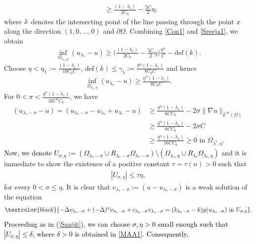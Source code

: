 \documentclass[11pt, notitlepage]{article}
\newcommand{\De} {\Delta}
\begin{document}
{\begin{align}
    &\geq \frac{(1-\lambda_1)}{2C_0}-\frac{5C}{2}\eta,
\end{align}
where $\Tilde{x}$ denotes the intersecting point of the line passing through the point $x$ along the direction $(1,0,...,0)$ and $\partial \Omega$. Combining \eqref{Con1} and \eqref{Sreeja1}, we obtain
\begin{align*}
    \inf_{\Omega_{\lambda_*,\eta}}(u_{\lambda_*}-u)\geq \Big( \frac{(1-\lambda_1)}{2C_0}-\frac{5C}{2}\eta\Big)\frac{\eta^\alpha}{C}-\mathrm{def}(k).
\end{align*}
Choose $\eta<\eta_1:=\frac{(1-\lambda_1)}{10C_0C}$, $\mathrm{def}(k)\leq \gamma_1:=\frac{\eta^\alpha(1-\lambda_1)}{8C_0C}$ and hence
\begin{align*}
     \inf_{\Omega_{\lambda_*,\eta}}(u_{\lambda_*}-u)\geq \frac{\eta^\alpha(1-\lambda_1)}{8C_0C}.
\end{align*}
For $0<\sigma< \frac{\eta^\alpha(1-\lambda_1)}{32C^2C_0}$, we have
\begin{align}\label{Sreeja2}
   (u_{\lambda_*-\sigma}-u)=(u_{\lambda_*-\sigma}-u_{\lambda_*}+u_{\lambda_*}-u)&\geq  \frac{\eta^\alpha(1-\lambda_1)}{8CC_0}-2\sigma\|\nabla u\|_{L^\infty(\Omega)}\nonumber\\
   &\geq  \frac{\eta^\alpha(1-\lambda_1)}{8CC_0}-2\sigma C\nonumber\\
   &\geq  \frac{\eta^\alpha(1-\lambda_1)}{16CC_0}\geq 0 \text{ in }\Omega_{\lambda^*,\eta}.
\end{align}
\textcolor{black}{Now, we denote $U_{\sigma,\eta}:=({\Omega}_{\lambda_*-\sigma}\cup R_{\lambda_*-\sigma}{\Omega}_{\lambda_*-\sigma})\setminus({\Omega}_{\lambda_*,\eta}\cup R_{\lambda_*}{\Omega}_{\lambda_*,\eta})$} and it is immediate to show the existence of a positive constant $\tau=\tau(n)>0$ such that 
\begin{align}\label{small}
    |U_{\sigma,\eta}|\leq \tau\eta,
\end{align}
for every $0<\sigma\leq \eta$. It is clear that $v_{\lambda_*-\sigma}:=(u-u_{\lambda_*-\sigma})$ is a weak solution of the equation 
\begin{align}\label{MA}
\textcolor{black}{-\De v_{\lambda_*-\sigma}+(-\De)^sv_{\lambda_*-\sigma}+c_{\lambda_*-\sigma}v_{\lambda_*-\sigma}=(k_{\lambda_*-\sigma}-k)g(u_{\lambda_*-\sigma}) \text{ in } U_{\sigma,\eta}}.
\end{align}
\textcolor{black}{Proceeding as in (\ref{Sanjit}), we can choose $\sigma,\eta>0$ small enough such that $|U_{\sigma,\eta}|\leq \delta$, where $\delta>0$ is obtained in \eqref{MAA1}. Consequently,
}}
\end{document}
